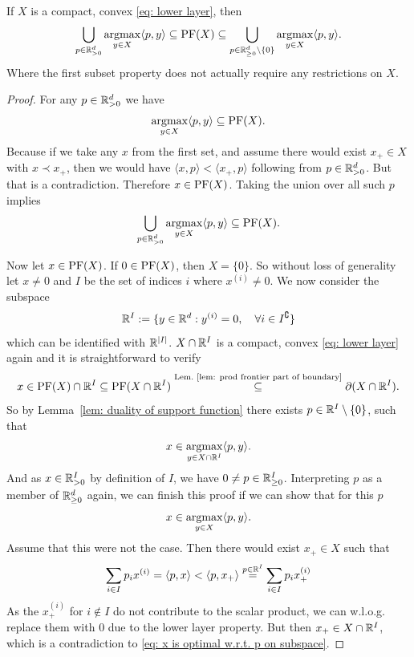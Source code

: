 \begin{lemma}
	If \(X\) is a compact, convex \ref{eq: lower layer}, then
	\[
		\bigcup_{p\in \mathbb{R}_{>0}^d} \operatorname*{argmax}_{y\in X}\langle p, y\rangle
		\subseteq \operatorname{PF}(X) \subseteq
		\bigcup_{p\in \mathbb{R}_{\ge 0}^d\setminus\{0\}}
		\operatorname*{argmax}_{y\in X}\langle p, y\rangle.
	\]
	Where the first subset property does not actually require any restrictions on
	\(X\).
\end{lemma}
\begin{proof}
	For any \(p\in\mathbb{R}_{>0}^d\) we have
	\[
		\operatorname*{argmax}_{y\in X}\langle p, y\rangle \subseteq \operatorname{PF}(X).
	\]
	Because if we take any \(x\) from the first
	set, and assume there would exist \(x_+\in X\) with \(x\prec x_+\), then we
	would have \(\langle x, p\rangle < \langle x_+, p\rangle\) following from
	\(p\in \mathbb{R}_{>0}^d\). But that is a contradiction. Therefore
	\(x\in\operatorname{PF}(X)\). Taking the union over all such \(p\) implies
	\[
		\bigcup_{p\in \mathbb{R}_{>0}^d} \operatorname*{argmax}_{y\in X}\langle p, y\rangle \subseteq \operatorname{PF}(X).
	\]

	Now let \(x\in \operatorname{PF}(X)\). If \(0\in\operatorname{PF}(X)\), then \(X=\{0\}\). So without loss
	of generality let \(x\neq 0\) and \(I\) be the set of indices \(i\) where
	\(x^{(i)}\neq 0\). We now consider the subspace
	\[
		\mathbb{R}^I := \{y\in \mathbb{R}^d : y^{(i)} = 0, \quad \forall i \in I^\complement\}
	\]
	which can be identified with \(\mathbb{R}^{|I|}\). \(X\cap\mathbb{R}^I\) is a compact,
	convex \ref{eq: lower layer} again and it is straightforward to verify
	\[
		x\in \operatorname{PF}(X)\cap \mathbb{R}^I
		\subseteq \operatorname{PF}(X\cap \mathbb{R}^I)
		\overset{\text{Lem.~\ref{lem: prod frontier part of boundary}}}\subseteq
		\partial(X\cap\mathbb{R}^I).
	\]
	So by Lemma~\ref{lem: duality of support function} there exists \(p\in
	\mathbb{R}^I\setminus \{0\}\), such that 
	\begin{equation}
		\label{eq: x is optimal w.r.t. p on subspace}
		x\in \operatorname*{argmax}_{y\in X\cap\mathbb{R}^I} \langle p, y\rangle.
	\end{equation}
	And as \(x\in\mathbb{R}_{>0}^I\) by definition of \(I\), we have \(0\neq
	p\in\mathbb{R}_{\ge 0}^I\). Interpreting \(p\) as a member of \(\mathbb{R}_{\ge
	0}^d\) again, we can finish this proof if we can show that for this \(p\)
	\[
		x\in\operatorname*{argmax}_{y\in X}\langle p, y\rangle.
	\]
	Assume that this were not the case. Then there would exist \(x_+\in X\)
	such that
	\[
		\sum_{i\in I}p_i x^{(i)}
		= \langle p, x\rangle
		< \langle p, x_+\rangle
		\overset{p\in\mathbb{R}^I}= \sum_{i\in I} p_i x_+^{(i)}
	\]
	As the \(x^{(i)}_+\) for \(i\notin I\) do not contribute to the scalar product,
	we can w.l.o.g. replace them with \(0\) due to the lower layer property.
	But then \(x_+\in X\cap \mathbb{R}^I\), which is a contradiction to \eqref{eq: x
	is optimal w.r.t. p on subspace}.
\end{proof}


